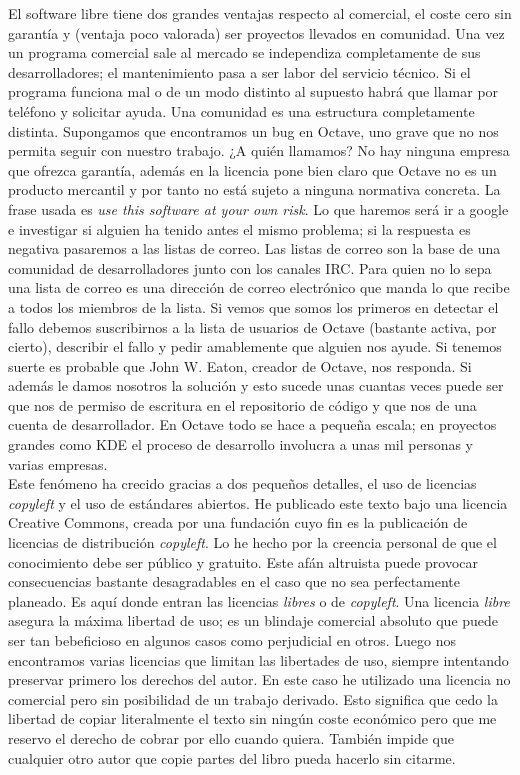 El software libre tiene dos grandes ventajas respecto al comercial, el
coste cero sin garantía y (ventaja poco valorada) ser proyectos
llevados en comunidad. Una vez un programa comercial sale al mercado
se independiza completamente de sus desarrolladores; el mantenimiento
pasa a ser labor del servicio técnico. Si el programa funciona mal o
de un modo distinto al supuesto habrá que llamar por teléfono y
solicitar ayuda. Una comunidad es una estructura completamente
distinta.  Supongamos que encontramos un bug en Octave, uno grave que
no nos permita seguir con nuestro trabajo. ¿A quién llamamos? No hay
ninguna empresa que ofrezca garantía, además en la licencia pone bien
claro que Octave no es un producto mercantil y por tanto no está
sujeto a ninguna normativa concreta. La frase usada es \emph{use this
  software at your own risk}. Lo que haremos será ir a google e
investigar si alguien ha tenido antes el mismo problema; si la
respuesta es negativa pasaremos a las listas de correo. Las listas de
correo son la base de una comunidad de desarrolladores junto con los
canales IRC. Para quien no lo sepa una lista de correo es una
dirección de correo electrónico que manda lo que recibe a todos los
miembros de la lista. Si vemos que somos los primeros en detectar el
fallo debemos suscribirnos a la lista de usuarios de Octave (bastante
activa, por cierto), describir el fallo y pedir amablemente que
alguien nos ayude. Si tenemos suerte es probable que John W. Eaton,
creador de Octave, nos responda. Si además le damos nosotros la
solución y esto sucede unas cuantas veces puede ser que nos de permiso
de escritura en el repositorio de código y que nos de una cuenta de
desarrollador. En Octave todo se hace a pequeña escala; en proyectos
grandes como KDE el proceso de desarrollo
involucra a unas mil personas y varias empresas.\\


Este fenómeno ha crecido gracias a dos pequeños detalles, el uso de
licencias \emph{copyleft} y el uso de estándares abiertos. He
publicado este texto bajo una licencia Creative Commons, creada por
una fundación cuyo fin es la publicación de licencias de distribución
\emph{copyleft}.  Lo he hecho por la creencia personal de que el
conocimiento debe ser público y gratuito. Este afán altruista puede
provocar consecuencias bastante desagradables en el caso que no sea
perfectamente planeado.  Es aquí donde entran las licencias
\emph{libres} o de \emph{copyleft}.  Una licencia \emph{libre} asegura
la máxima libertad de uso; es un blindaje comercial absoluto que puede
ser tan bebeficioso en algunos casos como perjudicial en otros. Luego
nos encontramos varias licencias que limitan las libertades de uso,
siempre intentando preservar primero los derechos del autor. En este
caso he utilizado una licencia no comercial pero sin posibilidad de un
trabajo derivado. Esto significa que cedo la libertad de copiar
literalmente el texto sin ningún coste económico pero que me reservo
el derecho de cobrar por ello cuando quiera. También impide que
cualquier otro autor que copie partes del
libro pueda hacerlo sin citarme.\\


